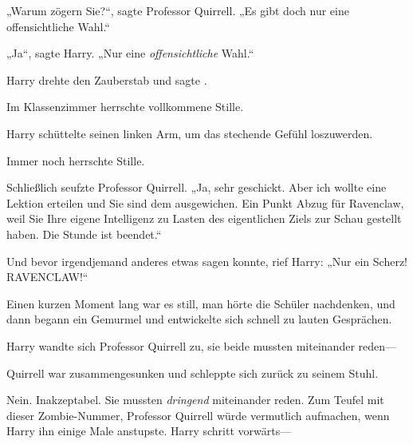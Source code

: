 „Warum zögern Sie?“, sagte Professor Quirrell. „Es gibt doch nur eine offensichtliche Wahl.“

„Ja“, sagte Harry. „Nur eine \emph{offensichtliche} Wahl.“

Harry drehte den Zauberstab und sagte .

Im Klassenzimmer herrschte vollkommene Stille.

Harry schüttelte seinen linken Arm, um das stechende Gefühl loszuwerden.

Immer noch herrschte Stille.

Schließlich seufzte Professor Quirrell. „Ja, sehr geschickt. Aber ich wollte eine Lektion erteilen und Sie sind dem ausgewichen. Ein Punkt Abzug für Ravenclaw, weil Sie Ihre eigene Intelligenz zu Lasten des eigentlichen Ziels zur Schau gestellt haben. Die Stunde ist beendet.“


Und bevor irgendjemand anderes etwas sagen konnte, rief Harry: „Nur ein Scherz! RAVENCLAW!“

Einen kurzen Moment lang war es still, man hörte die Schüler nachdenken, und dann begann ein Gemurmel und entwickelte sich schnell zu lauten Gesprächen.

Harry wandte sich Professor Quirrell zu, sie beide mussten miteinander reden—

Quirrell war zusammengesunken und schleppte sich zurück zu seinem Stuhl.

Nein. Inakzeptabel. Sie mussten \emph{dringend} miteinander reden. Zum Teufel mit dieser Zombie-Nummer, Professor Quirrell würde vermutlich aufmachen, wenn Harry ihn einige Male anstupste. Harry schritt vorwärts—

